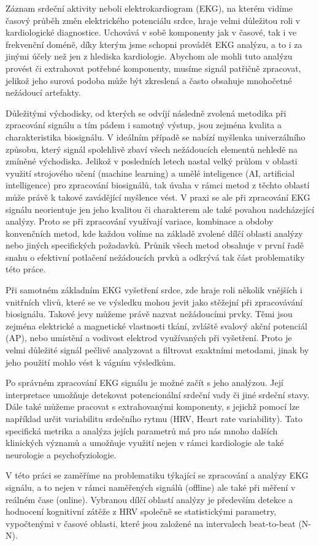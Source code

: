 Záznam srdeční aktivity neboli elektrokardiogram (EKG), na kterém vidíme časový
průběh změn elektrického potenciálu srdce, hraje velmi důležitou roli v
kardiologické diagnostice. Uchovává v sobě komponenty jak v časové, tak i ve
frekvenční doméně, díky kterým jsme schopni provádět EKG analýzu, a to i za
jinými účely než jen z hlediska kardiologie. Abychom ale mohli tuto analýzu
provést či extrahovat potřebné komponenty, musíme signál patřičně zpracovat,
jelikož jeho surová podoba může být zkreslená a často obsahuje mnohočetné
nežádoucí artefakty.

Důležitými východisky, od kterých se odvíjí následně zvolená metodika při
zpracování signálu a tím pádem i samotný výstup, jsou zejména kvalita a
charakteristika biosignálu. V ideálním případě se nabízí myšlenka univerzálního
způsobu, který signál spolehlivě zbaví všech nežádoucích elementů nehledě na
zmíněné východiska. Jelikož v posledních letech nastal velký průlom v oblasti
využití strojového učení (machine learning) a umělé inteligence (AI, artificial
intelligence) pro zpracování biosignálů, tak úvaha v rámci metod z těchto
oblastí může právě k takové zavádějící myšlence vést. V praxi se ale při
zpracování EKG signálu neorientuje jen jeho kvalitou či charakterem ale také
povahou nadcházející analýzy. Proto se při zpracování využívají variace,
kombinace a obdoby konvenčních metod, kde každou volíme na základě zvolené dílčí
oblasti analýzy nebo jiných specifických požadavků. Průnik všech metod obsahuje
v první řadě snahu o efektivní potlačení nežádoucích prvků a odkrývá tak část
problematiky této práce.

Při samotném základním EKG vyšetření srdce, zde hraje roli několik vnějších i
vnitřních vlivů, které se ve výsledku mohou jevit jako stěžejní při zpracovávání
biosignálu. Takové jevy můžeme právě nazvat nežádoucími prvky. Těmi jsou zejména
elektrické a magnetické vlastnosti tkání, zvláště svalový akční potenciál (AP),
nebo umístění a vodivost elektrod využívaných při vyšetření. Proto je velmi
důležité signál pečlivě analyzovat a filtrovat exaktními metodami, jinak by jeho
použití mohlo vést k vágním výsledkům. 

Po správném zpracování EKG signálu je možné začít s jeho analýzou. Její
interpretace umožňuje detekovat potencionální srdeční vady či jiné srdeční
stavy. Dále také můžeme pracovat s extrahovanými komponenty, s jejichž pomocí
lze například určit variabilitu srdečního rytmu (HRV, Heart rate variability).
Tato specifická metrika a analýza jejích parametrů má pro nás mnoho dalších
klinických významů a umožňuje využití nejen v rámci kardiologie ale také
neurologie a psychofyziologie.

V této práci se zaměříme na problematiku týkající se zpracování a analýzy EKG
signálu, a to nejen v rámci naměřených signálů (offline) ale také při měření v
reálném čase (online). Vybranou dílčí oblastí analýzy je především detekce a
hodnocení kognitivní zátěže z HRV společně se statistickými parametry,
vypočtenými v časové oblasti, které jsou založené na intervalech beat-to-beat
(N-N).
